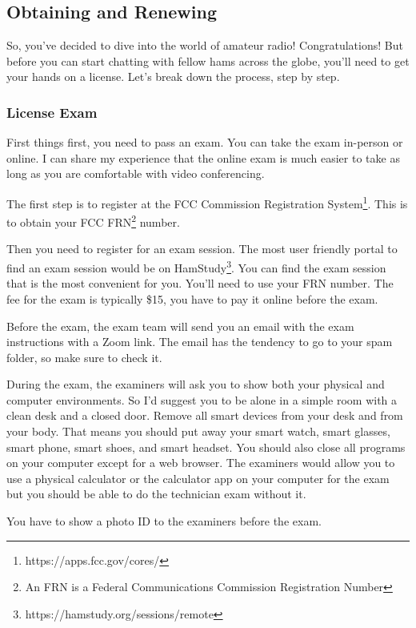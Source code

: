 \subsection{Obtaining and Renewing}
\label{subsec:obtain-renew}

So, you've decided to dive into the world of amateur radio! Congratulations! But before you can start chatting with fellow hams across the globe, you'll need to get your hands on a license. Let's break down the process, step by step.

\subsubsection{License Exam}
First things first, you need to pass an exam. You can take the exam in-person or online. 
I can share my experience that the online exam is much easier to take as long as you are comfortable with video conferencing.  

The first step is to register at the FCC Commission Registration System\footnote{https://apps.fcc.gov/cores/}. This is to obtain your FCC FRN\footnote{An FRN is a Federal Communications Commission Registration Number} number. 

Then you need to register for an exam session. The most user friendly portal to find an exam session would be on HamStudy\footnote{https://hamstudy.org/sessions/remote}. You can find the exam session that is the most convenient for you. You'll need to use your FRN number. The fee for the exam is typically \$15, you have to pay it online before the exam. 

Before the exam, the exam team will send you an email with the exam instructions with a Zoom link. The email has the tendency to go to your spam folder, so make sure to check it. 

During the exam, the examiners will ask you to show both your physical and computer environments. So I'd suggest you to be alone in a simple room with a clean desk and a closed door. Remove all smart devices from your desk and from your body. That means you should put away your smart watch, smart glasses, smart phone, smart shoes, and smart headset. You should also close all programs on your computer except for a web browser. The examiners would allow you to use a physical calculator or the calculator app on your computer for the exam but you should be able to do the technician exam without it. 

You have to show a photo ID to the examiners before the exam. 

